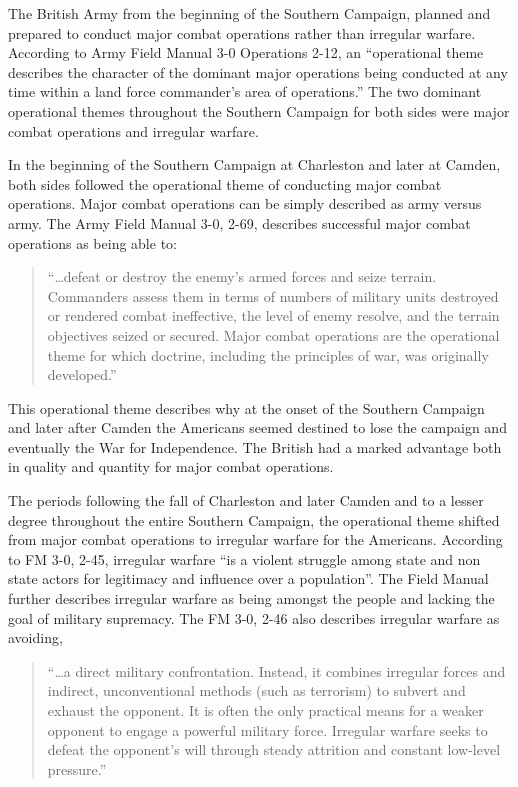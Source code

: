 The British Army from the beginning of the Southern Campaign, planned and
prepared to conduct major combat operations rather than irregular warfare.
According to Army Field Manual 3-0 Operations 2-12, an ``operational theme
describes the character of the dominant major operations being conducted at any
time within a land force commander's area of operations.''  The two dominant
operational themes throughout the Southern Campaign for both sides were major
combat operations and irregular warfare.

In the beginning of the Southern Campaign at Charleston and later at Camden,
both sides followed the operational theme of conducting major combat
operations.  Major combat operations can be simply described as army versus
army.  The Army Field Manual 3-0, 2-69, describes successful major combat
operations as being able to: 

\begin{quote}
``\dots defeat or destroy the enemy's armed forces and seize terrain.
Commanders assess them in terms of numbers of military units destroyed or
rendered combat ineffective, the level of enemy resolve, and the terrain
objectives seized or secured. Major combat operations are the operational theme
for which doctrine, including the principles of war, was originally
developed.''
\end{quote}

This operational theme describes why at the onset of the Southern Campaign and
later after Camden the Americans seemed destined to lose the campaign and
eventually the War for Independence.  The British had a marked advantage both
in quality and quantity for major combat operations.

The periods following the fall of Charleston and later Camden and to a lesser
degree throughout the entire Southern Campaign, the operational theme shifted
from major combat operations to irregular warfare for the Americans.  According
to FM 3-0, 2-45, irregular warfare ``is a violent struggle among state and non
state actors for legitimacy and influence over a population''.  The Field
Manual further describes irregular warfare as being amongst the people and
lacking the goal of military supremacy.  The FM 3-0, 2-46 also describes
irregular warfare as avoiding,

\begin{quote}
 ``\ldots a direct military confrontation. Instead, it combines irregular
 forces and indirect, unconventional methods (such as terrorism) to subvert and
 exhaust the opponent. It is often the only practical means for a weaker
 opponent to engage a powerful military force. Irregular warfare seeks to
 defeat the opponent's will through steady attrition and constant low-level
 pressure.''
\end{quote}

